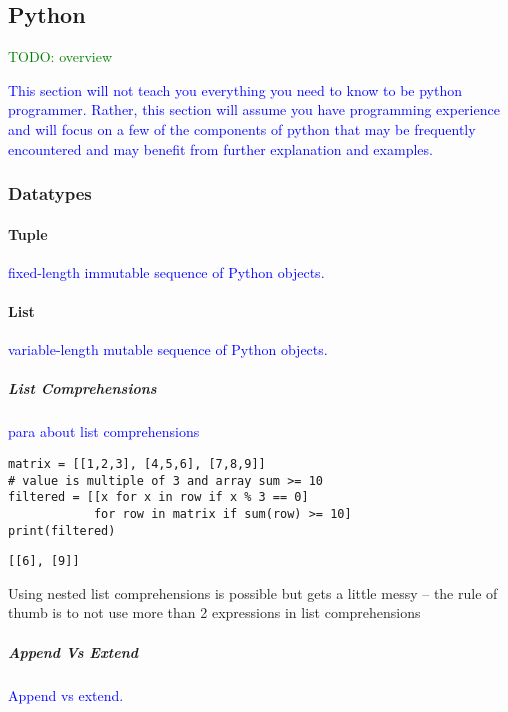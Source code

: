 \subsection{Python}

\textcolor{green}{TODO: overview}

\textcolor{blue}{This section will not teach you everything you need to know to be python programmer. Rather, this section will assume you have programming experience and will focus on a few of the components of python that may be frequently encountered and may benefit from further explanation and examples.}

\subsubsection{Datatypes}

\paragraph{Tuple}

\textcolor{blue}{fixed-length immutable sequence of Python objects.}

\paragraph{List}

\textcolor{blue}{variable-length mutable sequence of Python objects.}

\subparagraph{List Comprehensions}

\textcolor{blue}{para about list comprehensions}

\begin{lstlisting}[style=pyInStyle]
matrix = [[1,2,3], [4,5,6], [7,8,9]]
# value is multiple of 3 and array sum >= 10
filtered = [[x for x in row if x % 3 == 0]
            for row in matrix if sum(row) >= 10]
print(filtered)
\end{lstlisting}
\begin{lstlisting}[style=pyOutStyle]
[[6], [9]]
\end{lstlisting}
\begin{markdown}
Using nested list comprehensions is possible but gets a little messy -- the rule of thumb is to not use more than 2 expressions in list comprehensions
\end{markdown}

\subparagraph{Append Vs Extend}

\textcolor{blue}{Append vs extend.}

